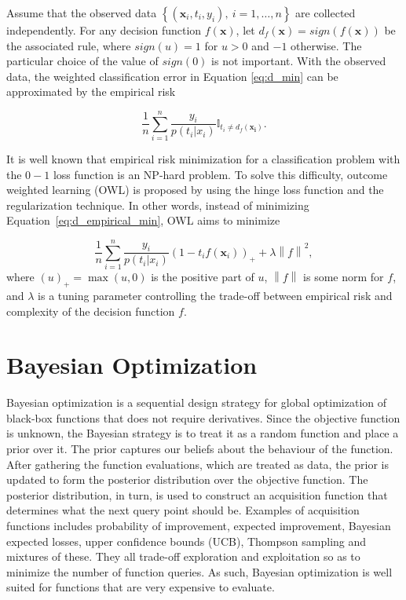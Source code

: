 \documentclass{article}
\begin{document}
Assume that the observed data $\left \{
  (\mathbf{x}_i,t_i,y_i),~i=1,\ldots , n \right \}$ are collected
independently. For any decision function $f(\mathbf{x})$, let
$d_f(\mathbf{x}) = sign(f(\mathbf{x}))$ be the associated rule, where
$sign(u) = 1$ for $u > 0$ and $-1$ otherwise. The particular choice of
the value of $sign(0)$ is not important. With the observed data, the
weighted classification error in Equation \ref{eq:d_min} can be approximated by
the empirical risk

\begin{equation} \label{eq:d_empirical_min}
  \frac{1}{n}\sum_{i=1}^{n}\frac{y_i}{p(t_i|x_i)}\mathbb{I}_{t_i \neq
    d_f(\mathbf{x_i})} .
\end{equation}

It is well known that empirical risk minimization for a classification
problem with the $0-1$ loss function is an NP-hard problem. To solve
this difficulty, outcome weighted learning (OWL) is proposed by
\cite{zhao2012estimating} using the hinge loss function and the
regularization technique. In other words, instead of minimizing
Equation~\ref{eq:d_empirical_min}, OWL aims to minimize

\begin{equation} \label{eq:d_owl_empirical_min}
  \frac{1}{n}\sum_{i=1}^{n}\frac{y_i}{p(t_i|x_i)}(1-t_if(\mathbf{x}_i))_{+}+\lambda\left
    \| f \right \|^2 ,
\end{equation}
where $(u)_+=\max(u,0)$ is the positive part of $u$, $\left \| f
\right \|$ is some norm for $f$, and $\lambda$ is a tuning parameter
controlling the trade-off between empirical risk and complexity of the
decision function $f$.
\section{Bayesian Optimization}
Bayesian optimization is a sequential design strategy for global optimization of black-box functions that does not require derivatives. Since the objective function is unknown, the Bayesian
strategy is to treat it as a random function and place a prior over it. The prior captures our beliefs about the behaviour of the
function. After gathering the function evaluations, which are treated
as data, the prior is updated to form the posterior distribution
over the objective function. The posterior distribution, in turn, is
used to construct an acquisition function that determines what the
next query point should be. Examples of acquisition functions includes
probability of improvement, expected improvement, Bayesian expected
losses, upper confidence bounds (UCB), Thompson sampling and mixtures
of these. They all trade-off exploration and exploitation so as to
minimize the number of function queries. As such, Bayesian
optimization is well suited for functions that are very expensive to evaluate.
\end{document}

